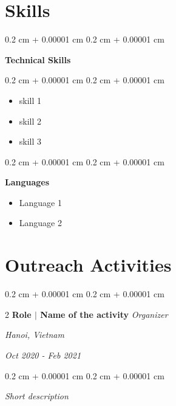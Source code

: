\documentclass[10pt, letterpaper]{article}
\newenvironment{highlights}{
    \begin{itemize}[
        topsep=0.10 cm,
        parsep=0.10 cm,
        partopsep=0pt,
        itemsep=0pt,
        leftmargin=0.4 cm + 10pt
    ]
}{
    \end{itemize}
} %
\newenvironment{onecolentry}{
    \begin{adjustwidth}{
        0.2 cm + 0.00001 cm
    }{
        0.2 cm + 0.00001 cm
    }
}{
    \end{adjustwidth}
} %
\newenvironment{twocolentry}[2][]{
    \onecolentry
    \def\secondColumn{#2}
    \setcolumnwidth{\fill, 4.5 cm}
    \begin{paracol}{2}
}{
    \switchcolumn \raggedleft \secondColumn
    \end{paracol}
    \endonecolentry
} %
\begin{document}
\section{Skills}
    \vspace{0.2 cm}
        \begin{onecolentry}

        \textbf{Technical Skills}
        \end{onecolentry}

        \vspace{0.10 cm}
        \begin{onecolentry}
            \begin{highlights}
                \item skill 1 %
                \item skill 2
                \item skill 3
            \end{highlights}
        \end{onecolentry}

        \vspace{0.2 cm}

        \begin{onecolentry}
         \textbf{Languages}
        \begin{itemize}
            \item Language 1 %
            \item Language 2
        \end{itemize}
        \end{onecolentry}

    \vspace{0.2 cm}

\section{Outreach Activities}
        \vspace{0.2 cm}
        \begin{twocolentry}{
        \textit{Hanoi, Vietnam} %
        
        \textit{Oct 2020 - Feb 2021}} %
            \textbf{Role  $|$ Name of the activity} %
            \textit{Organizer} %
        \end{twocolentry}
          \begin{onecolentry}
            \hspace{-5pt}
            \textit{Short description} %
        \end{onecolentry}
\end{document}
